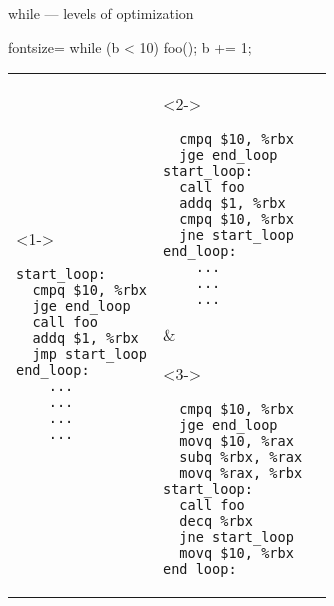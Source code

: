 \begin{frame}[fragile,label=loopAsmEx]{while --- levels of optimization}
\begin{ccodeNL*}{fontsize=\small}
while (b < 10) { foo(); b += 1; }
\end{ccodeNL*}
\lstset{
    language=myasm,
    style=smaller,
    escapechar=`,
    morekeywords=decq,
}
\begin{tabular}{l|l|l}
\begin{minipage}{4.7cm}
\begin{visibleenv}<1->
\begin{lstlisting}
start_loop:
  cmpq $10, %rbx
  jge end_loop
  call foo
  addq $1, %rbx
  jmp start_loop
end_loop:
    ...
    ...
    ...
    ...
\end{lstlisting}
\end{visibleenv}
\end{minipage}
&
\begin{minipage}{4.5cm}
\begin{visibleenv}<2->
\begin{lstlisting}
  cmpq $10, %rbx
  jge end_loop
start_loop:
  call foo
  addq $1, %rbx
  cmpq $10, %rbx
  jne start_loop
end_loop:
    ...
    ...
    ...
\end{lstlisting}
\end{visibleenv}
\end{minipage}
&
\begin{minipage}{4.7cm}
\begin{visibleenv}<3->
\begin{lstlisting}
  cmpq $10, %rbx
  jge end_loop
  movq $10, %rax
  subq %rbx, %rax
  movq %rax, %rbx
start_loop:
  call foo
  decq %rbx
  jne start_loop
  movq $10, %rbx
end_loop:
\end{lstlisting}
\end{visibleenv}
\end{minipage}
\end{tabular}
\end{frame}

